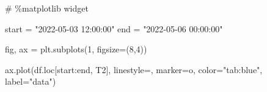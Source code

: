 \documentclass[
  letterpaper,
  DIV=11,
  numbers=noendperiod,
  oneside]{scrreprt}
\newenvironment{Shaded}{\begin{snugshade}}{\end{snugshade}}
\newcommand{\CommentTok}[1]{\textcolor[rgb]{0.37,0.37,0.37}{#1}}
\newcommand{\DecValTok}[1]{\textcolor[rgb]{0.68,0.00,0.00}{#1}}
\newcommand{\NormalTok}[1]{\textcolor[rgb]{0.00,0.23,0.31}{#1}}
\newcommand{\OperatorTok}[1]{\textcolor[rgb]{0.37,0.37,0.37}{#1}}
\newcommand{\StringTok}[1]{\textcolor[rgb]{0.13,0.47,0.30}{#1}}
\begin{document}
\begin{Shaded}
\begin{Highlighting}[]
\CommentTok{\# \%matplotlib widget}

\NormalTok{start }\OperatorTok{=} \StringTok{"2022{-}05{-}03 12:00:00"}
\NormalTok{end }\OperatorTok{=} \StringTok{"2022{-}05{-}06 00:00:00"}

\NormalTok{fig, ax }\OperatorTok{=}\NormalTok{ plt.subplots(}\DecValTok{1}\NormalTok{, figsize}\OperatorTok{=}\NormalTok{(}\DecValTok{8}\NormalTok{,}\DecValTok{4}\NormalTok{))}

\NormalTok{ax.plot(df.loc[start:end, }\StringTok{\textquotesingle{}T2\textquotesingle{}}\NormalTok{], linestyle}\OperatorTok{=}\StringTok{\textquotesingle{}{-}\textquotesingle{}}\NormalTok{, marker}\OperatorTok{=}\StringTok{\textquotesingle{}o\textquotesingle{}}\NormalTok{, color}\OperatorTok{=}\StringTok{"tab:blue"}\NormalTok{, label}\OperatorTok{=}\StringTok{"data"}\NormalTok{)}


\end{Highlighting}
\end{Shaded}
\end{document}
